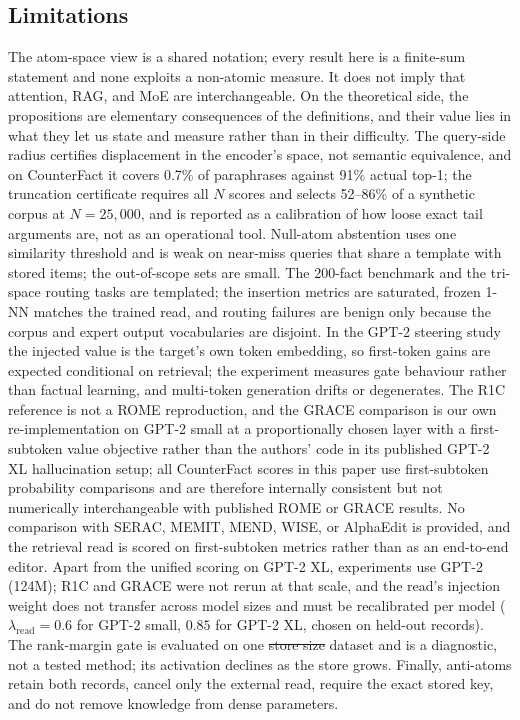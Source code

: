 \documentclass[preprint,12pt]{elsarticle}
\makeatletter
\newif\ifmarkchanges
\newcommand{\revii}[1]{\ifmarkchanges{\color{blue}#1}\else#1\fi} %
\providecommand{\DIFdeltex}[1]{{\protect\color{red}\sout{#1}}} %
\providecommand{\DIFaddbegin}{} %
\providecommand{\DIFaddend}{} %
\providecommand{\DIFdelbegin}{} %
\providecommand{\DIFdelend}{} %
\providecommand{\DIFdel}[1]{\texorpdfstring{\DIFdeltex{#1}}{}} %
\providecommand{\DIFscaledelfig}{0.5}
\newlength{\DIFdelgraphicswidth} %
\newlength{\DIFdelgraphicsheight} %
\providecommand{\DIFaddincludegraphics}[2][]{{\color{blue}\fbox{\DIFOincludegraphics[#1]{#2}}}} %
\providecommand{\DIFdelincludegraphics}[2][]{%
\sbox{\DIFdelgraphicsbox}{\DIFOincludegraphics[#1]{#2}}%
\settoboxwidth{\DIFdelgraphicswidth}{\DIFdelgraphicsbox} %
\settoboxtotalheight{\DIFdelgraphicsheight}{\DIFdelgraphicsbox} %
\scalebox{\DIFscaledelfig}{%
\parbox[b]{\DIFdelgraphicswidth}{\usebox{\DIFdelgraphicsbox}\\[-\baselineskip] \rule{\DIFdelgraphicswidth}{0em}}\llap{\resizebox{\DIFdelgraphicswidth}{\DIFdelgraphicsheight}{%
\setlength{\unitlength}{\DIFdelgraphicswidth}%
\begin{picture}(1,1)%
\thicklines\linethickness{2pt} %
{\color[rgb]{1,0,0}\put(0,0){\framebox(1,1){}}}%
{\color[rgb]{1,0,0}\put(0,0){\line( 1,1){1}}}%
{\color[rgb]{1,0,0}\put(0,1){\line(1,-1){1}}}%
\end{picture}%
}\hspace*{3pt}}} %
} %
\DeclareRobustCommand{\DIFaddbegin}{\DIFOaddbegin \let\includegraphics\DIFaddincludegraphics} %
\DeclareRobustCommand{\DIFaddend}{\DIFOaddend \let\includegraphics\DIFOincludegraphics} %
\DeclareRobustCommand{\DIFdelbegin}{\DIFOdelbegin \let\includegraphics\DIFdelincludegraphics} %
\DeclareRobustCommand{\DIFdelend}{\DIFOaddend \let\includegraphics\DIFOincludegraphics} %
\let\sout@orig\sout %
\renewcommand{\sout}[1]{\ifmmode\text{\sout@orig{\ensuremath{#1}}}\else\sout@orig{#1}\fi} %
\makeatother
\begin{document}
\subsection{Limitations}
The atom-space view is a shared notation; every result here is a finite-sum statement and none exploits a non-atomic measure. It does not imply that attention, RAG, and MoE are interchangeable. On the theoretical side, the propositions are elementary consequences of the definitions, and their value lies in what they let us state and measure rather than in their difficulty. The query-side radius certifies displacement in the encoder's space, not semantic equivalence, and on CounterFact it covers 0.7\% of paraphrases against 91\% actual top-1; the truncation certificate requires all $N$ scores and selects 52--86\% of a synthetic corpus at $N=25{,}000$, and is reported as a calibration of how loose exact tail arguments are, not as an operational tool. Null-atom abstention uses one similarity threshold and is weak on near-miss queries that share a template with stored items; the out-of-scope sets are small. The 200-fact benchmark and the tri-space routing tasks are templated; the insertion metrics are saturated, frozen 1-NN matches the trained read, and routing failures are benign only because the corpus and expert output vocabularies are disjoint. In the GPT-2 steering study the injected value is the target's own token embedding, so first-token gains are expected conditional on retrieval; the experiment measures gate behaviour rather than factual learning, and multi-token generation drifts or degenerates. The R1C reference is not a ROME reproduction, and the GRACE comparison is our own re-implementation on GPT-2 small at a proportionally chosen layer with a first-subtoken value objective rather than the authors' code in its published GPT-2 XL hallucination setup; all CounterFact scores in this paper use first-subtoken probability comparisons and are therefore internally consistent but not numerically interchangeable with published ROME or GRACE results. No comparison with SERAC, MEMIT, MEND, WISE, or AlphaEdit is provided, and the retrieval read is scored on first-subtoken metrics rather than as an end-to-end editor. Apart from the unified scoring on GPT-2 XL, experiments use GPT-2 (124M); R1C and GRACE were not rerun at that scale, and the read's injection weight does not transfer across model sizes and must be recalibrated per model ($\lambda_{\mathrm{read}}=0.6$ for GPT-2 small, $0.85$ for GPT-2 XL, chosen on held-out records). The rank-margin gate is evaluated on one \DIFdelbegin \DIFdel{store size }\DIFdelend \DIFaddbegin \revii{dataset} \DIFaddend and is a diagnostic, not a tested method\DIFaddbegin \revii{; its activation declines as the store grows}\DIFaddend . Finally, anti-atoms retain both records, cancel only the external read, require the exact stored key, and do not remove knowledge from dense parameters.
\end{document}
